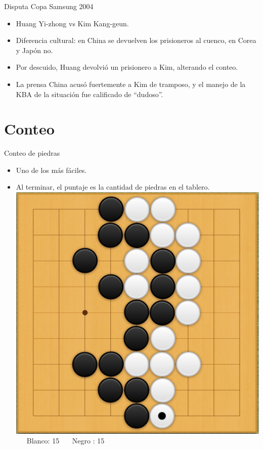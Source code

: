 \documentclass{beamer}
\begin{document}
\begin{frame}{Disputa Copa Samsung 2004}
  
  \begin{itemize}
    \item Huang Yi-zhong vs Kim Kang-geun.
    \item Diferencia cultural: en China se devuelven los prisioneros al cuenco, en Corea y Japón no. 
    \item Por descuido, Huang devolvió un prisionero a Kim, alterando el conteo.
    \item La prensa China acusó fuertemente a Kim de tramposo, y el manejo de la KBA de la situación fue calificado de ``dudoso''. 
    
  \end{itemize}
  
\end{frame}

\section{Conteo}

\begin{frame}{Conteo de piedras}
  
  \begin{itemize}
    \item Uno de los más fáciles.
    \item Al terminar, el puntaje es la cantidad de piedras en el tablero. 
    \includegraphics[scale=0.17]{ejemplo-conteo.png} \ \ \ Blanco: 15 \ \ \ Negro : 15  
  \end{itemize}
  
\end{frame}
\end{document}
